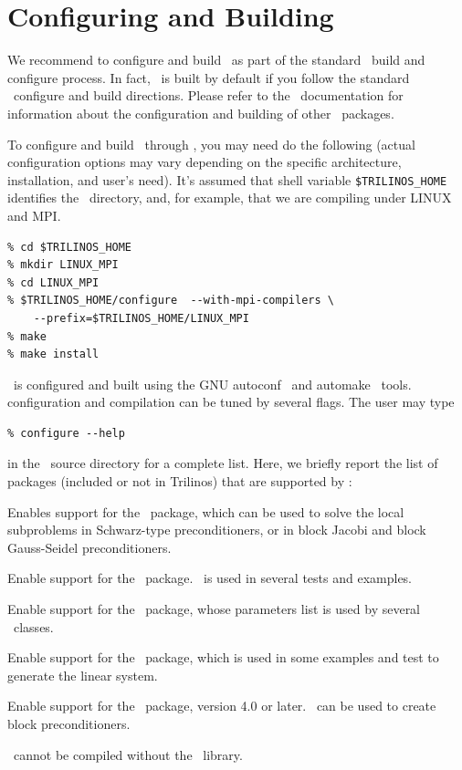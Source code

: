 \section{Configuring and Building \ifpack}
\label{sec:config}

We recommend to configure and build \ifpack\ as part of the standard 
\trilinos~build and configure process.  In fact,
\ifpack\ is built by default if you follow the standard \trilinos~configure
and build directions. Please refer to the \trilinos~documentation 
for information about the configuration and building of
other \trilinos~packages.

\smallskip

To configure and build \ifpack\ through \trilinos, you may need do the
following (actual configuration options may vary depending on the
specific architecture, installation, and user's need).  It's assumed
that shell variable \verb!$TRILINOS_HOME!  identifies the
\trilinos~directory, and, for example, that we are compiling under LINUX
and MPI.
\begin{verbatim}
% cd $TRILINOS_HOME
% mkdir LINUX_MPI
% cd LINUX_MPI
% $TRILINOS_HOME/configure  --with-mpi-compilers \
    --prefix=$TRILINOS_HOME/LINUX_MPI
% make
% make install
\end{verbatim}

\ifpack\ is configured and built using the GNU autoconf~\cite{Autoconf} and
automake~\cite{Automake} tools. 
\ifpack configuration and compilation can be tuned by several flags.
The user may type 
\begin{verbatim}
% configure --help
\end{verbatim}
in the \ifpack\ source directory for a complete list. Here, we briefly report
the list of packages (included or not in Trilinos) that are supported 
by \ifpack:

\medskip

{Enables support for the \amesos~package, which can be used to solve the
  local subproblems in Schwarz-type preconditioners, or in
    block Jacobi and block Gauss-Seidel preconditioners.}

{Enable support for the \aztecoo\ package. \aztecoo~is used in several tests
  and examples.}

{Enable support for the \teuchos\ package, whose parameters list is used by
  several \ifpack\ classes.}

{Enable support for the \triutils\ package, which is used in some examples and
  test to generate the linear system.}

{Enable support for the \metis\ package, version 4.0 or later. \metis\ can be
  used to create block preconditioners.}

\begin{remark}
\ifpack\ cannot be compiled without the \epetra\ library.
\end{remark}
